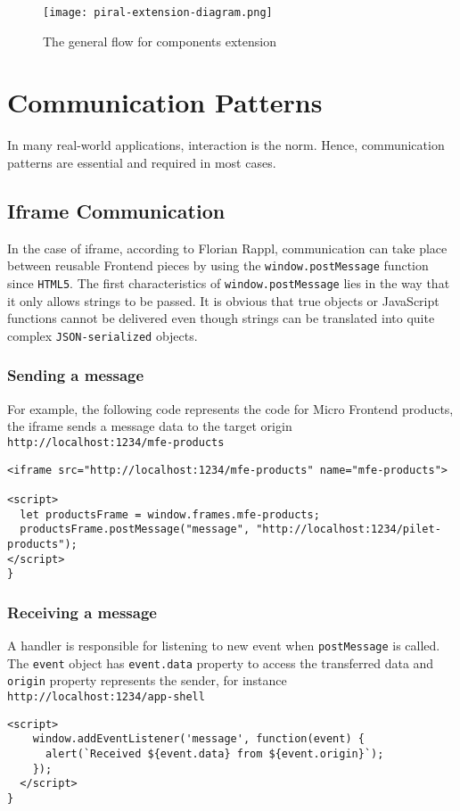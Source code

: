 \documentclass[a4paper]{book}
\begin{document}
\begin{figure}[h!]
  \centering
  \captionsetup{justification=centering}
  \texttt{[image: piral-extension-diagram.png]}
  \caption{The general flow for components extension \cite{Rap20}}
  \label{fig:extension-diagram}
\end{figure}

\section{Communication Patterns}
In many real-world applications, interaction is the norm. Hence, communication patterns are essential and required in most cases.
\subsection{Iframe Communication}

In the case of iframe, according to Florian Rappl, communication can take place between reusable Frontend pieces by using the \verb|window.postMessage| function since \verb|HTML5|. The first characteristics of \verb|window.postMessage| lies in the way that it only allows strings to be passed. It is obvious that true objects or JavaScript functions cannot be delivered even though strings can be translated into quite complex \verb|JSON-serialized| objects. \cite{Rap20}
\subsubsection{Sending a message}
For example, the following code represents the code for Micro Frontend products, the iframe sends a message data to the target origin \verb|http://localhost:1234/mfe-products|
\begin{lstlisting}[caption={Iframe script of Micro Frontend products}]
<iframe src="http://localhost:1234/mfe-products" name="mfe-products">

<script>
  let productsFrame = window.frames.mfe-products;
  productsFrame.postMessage("message", "http://localhost:1234/pilet-products");
</script>
}
\end{lstlisting}
\subsubsection{Receiving a message}
A handler is responsible for listening to new event when \verb|postMessage| is called. The \verb|event| object has \verb|event.data| property to access the transferred data and \verb|origin| property represents the sender, for instance \verb|http://localhost:1234/app-shell|
\begin{lstlisting}[caption={An iframe script can be properly set up for receiving the message in other iframes}]
  <script>
    window.addEventListener('message', function(event) {
      alert(`Received ${event.data} from ${event.origin}`);
    });
  </script>
}
\end{lstlisting}
\end{document}
